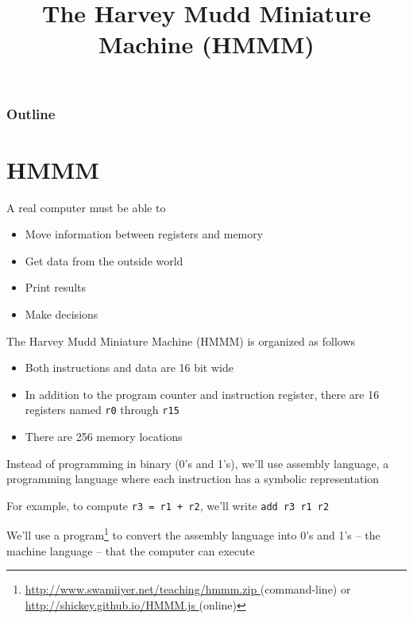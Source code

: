 \documentclass[8pt,a4paper,compress]{beamer}
\title{The Harvey Mudd Miniature Machine (HMMM)}
\date{}
\begin{document}
\begin{frame}
\vfill
\titlepage
\end{frame}

\begin{frame}
\frametitle{Outline}
\tableofcontents
\end{frame}

\section{HMMM}
\begin{frame}[fragile]
\pause

A real computer must be able to
\begin{itemize}
\item Move information between registers and memory
\item Get data from the outside world
\item Print results
\item Make decisions
\end{itemize}

\pause
\bigskip

The Harvey Mudd Miniature Machine (HMMM) is organized as follows
\begin{itemize}
\item Both instructions and data are 16 bit wide
\item In addition to the program counter and instruction register, there are 16 registers named \lstinline{r0} through \lstinline{r15}
\item There are 256 memory locations
\end{itemize}

\pause
\bigskip

Instead of programming in binary (0's and 1's), we'll use assembly language, a programming language where each instruction has a symbolic representation

\pause
\bigskip

For example, to compute \lstinline{r3 = r1 + r2}, we'll write \lstinline{add r3 r1 r2}

\pause
\bigskip

We'll use a program\footnote{\href{http://www.swamiiyer.net/teaching/hmmm.zip}{http://www.swamiiyer.net/teaching/hmmm.zip \ExternalLink} (command-line) or \href{http://shickey.github.io/HMMM.js}{http://shickey.github.io/HMMM.js \ExternalLink} (online)} to convert the assembly language into 0's and 1's -- the machine language -- that the computer can execute
\end{frame}
\end{document}
